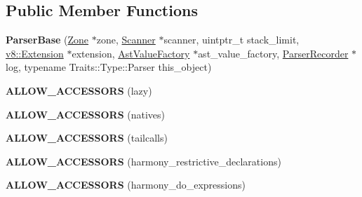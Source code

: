 \subsection*{Public Member Functions}
\begin{DoxyCompactItemize}
\item 
{\bfseries Parser\+Base} (\hyperlink{classv8_1_1internal_1_1_zone}{Zone} $\ast$zone, \hyperlink{classv8_1_1internal_1_1_scanner}{Scanner} $\ast$scanner, uintptr\+\_\+t stack\+\_\+limit, \hyperlink{classv8_1_1_extension}{v8\+::\+Extension} $\ast$extension, \hyperlink{classv8_1_1internal_1_1_ast_value_factory}{Ast\+Value\+Factory} $\ast$ast\+\_\+value\+\_\+factory, \hyperlink{classv8_1_1internal_1_1_parser_recorder}{Parser\+Recorder} $\ast$log, typename Traits\+::\+Type\+::\+Parser this\+\_\+object)\hypertarget{classv8_1_1internal_1_1_parser_base_a1945cf959a98c0e9e2e238cb582d2386}{}\label{classv8_1_1internal_1_1_parser_base_a1945cf959a98c0e9e2e238cb582d2386}

\item 
{\bfseries A\+L\+L\+O\+W\+\_\+\+A\+C\+C\+E\+S\+S\+O\+RS} (lazy)\hypertarget{classv8_1_1internal_1_1_parser_base_aa97598f588be757c8b558e8ff4aa950e}{}\label{classv8_1_1internal_1_1_parser_base_aa97598f588be757c8b558e8ff4aa950e}

\item 
{\bfseries A\+L\+L\+O\+W\+\_\+\+A\+C\+C\+E\+S\+S\+O\+RS} (natives)\hypertarget{classv8_1_1internal_1_1_parser_base_a02154cc2425559d9759e80d0ef5fb69d}{}\label{classv8_1_1internal_1_1_parser_base_a02154cc2425559d9759e80d0ef5fb69d}

\item 
{\bfseries A\+L\+L\+O\+W\+\_\+\+A\+C\+C\+E\+S\+S\+O\+RS} (tailcalls)\hypertarget{classv8_1_1internal_1_1_parser_base_a9c29aa300d96e7df7b8e39674d5c4937}{}\label{classv8_1_1internal_1_1_parser_base_a9c29aa300d96e7df7b8e39674d5c4937}

\item 
{\bfseries A\+L\+L\+O\+W\+\_\+\+A\+C\+C\+E\+S\+S\+O\+RS} (harmony\+\_\+restrictive\+\_\+declarations)\hypertarget{classv8_1_1internal_1_1_parser_base_ac95bb59f07ef6a94beeb698c66b1cd77}{}\label{classv8_1_1internal_1_1_parser_base_ac95bb59f07ef6a94beeb698c66b1cd77}

\item 
{\bfseries A\+L\+L\+O\+W\+\_\+\+A\+C\+C\+E\+S\+S\+O\+RS} (harmony\+\_\+do\+\_\+expressions)\hypertarget{classv8_1_1internal_1_1_parser_base_a29ac62955db9f38588995235445ebfa0}{}\label{classv8_1_1internal_1_1_parser_base_a29ac62955db9f38588995235445ebfa0}


\end{DoxyCompactItemize}
